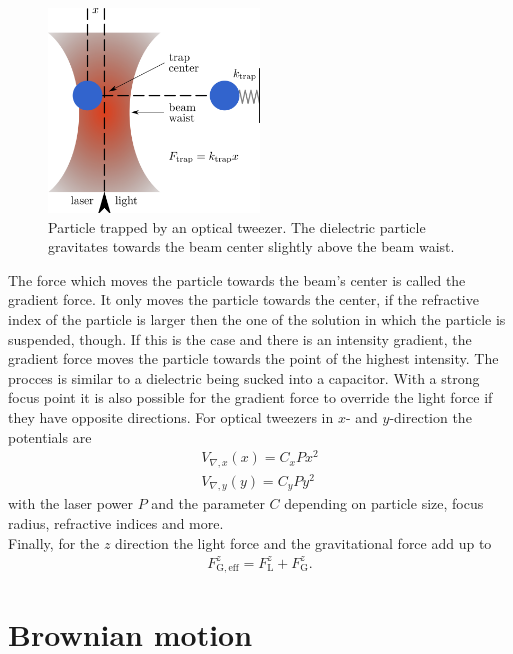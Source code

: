 \documentclass[.../bericht]{subfilies}
\begin{document}
    \begin{figure}[bt]
    \centering
    \includegraphics[width=0.5\textwidth]{figures/opticaltweezer}
    \caption{Particle trapped by an optical tweezer. The dielectric particle gravitates towards the beam center slightly above the beam waist. \cite{wiki:optical-tweezers}}
     \label{fig:tweezer}
    \end{figure}

    The force which moves the particle towards the beam's center is called the gradient force. It only moves the particle towards the center, if the refractive index of the particle is larger then the one of the solution in which the particle is suspended, though. If this is the case and there is an intensity gradient, the gradient force moves the particle towards the point of the highest intensity. The procces is similar to a dielectric being sucked into a capacitor. With a strong focus point it is also possible for the gradient force to override the light force if they have opposite directions. For optical tweezers in $x$- and $y$-direction the potentials are
    \begin{align}
    V_{\nabla,x}(x)=C_xPx^2\\
    V_{\nabla,y}(y)=C_yPy^2
    \end{align}
    with the laser power $P$ and the parameter $C$ depending on particle size, focus radius, refractive indices and more. \\
    Finally, for the $z$ direction the light force and the gravitational force add up to
    \begin{align}
    F_\mathrm{G,eff}^z=F_\mathrm{L}^z+F_\mathrm{G}^z.
    \end{align}
    \cite{helden}


    \section{Brownian motion}
    \label{sec:brownian-motion}
\end{document}
